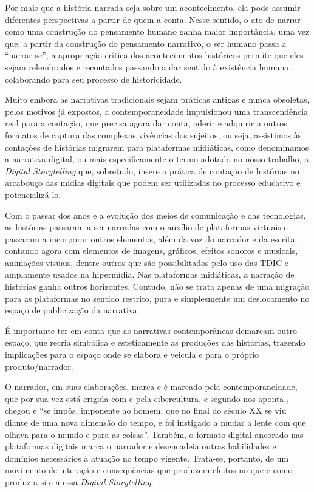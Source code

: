 \documentclass[portuguese]{textolivre}
\begin{document}
Por mais que a história narrada seja sobre um acontecimento, ela pode assumir diferentes perspectivas a partir de quem a conta. Nesse sentido, o ato de narrar como uma construção do pensamento humano ganha maior importância, uma vez que, a partir da construção do pensamento narrativo, o ser humano passa a “narrar-se”; a apropriação crítica dos acontecimentos históricos permite que eles sejam relembrados e recontados passando a dar sentido à existência humana \cite{rodrigues2020narrativas,rodrigues2023para}, colaborando para seu processo de historicidade.

Muito embora as narrativas tradicionais sejam práticas antigas e nunca obsoletas, pelos motivos já expostos, a contemporaneidade impulsionou uma transcendência real para a contação, que precisa agora dar conta, aderir e adquirir a outros formatos de captura das complexas vivências dos sujeitos, ou seja, assistimos às contações de histórias migrarem para plataformas midiáticas, como denominamos a narrativa digital, ou mais especificamente o termo adotado no nosso trabalho, a \textit{Digital Storytelling} que, sobretudo, insere a prática de contação de histórias no arcabouço das mídias digitais que podem ser utilizadas no processo educativo e potencializá-lo.

Com o passar dos anos e a evolução dos meios de comunicação e das tecnologias, as histórias passaram a ser narradas com o auxílio de plataformas virtuais e passaram a incorporar outros elementos, além da voz do narrador e da escrita; contando agora com elementos de imagens, gráficos, efeitos sonoros e musicais, animações visuais, dentre outros que são possibilitados pelo uso das TDIC e amplamente usados na hipermídia. Nas plataformas midiáticas, a narração de histórias ganha outros horizontes. Contudo, não se trata apenas de uma migração para as plataformas no sentido restrito, pura e simplesmente um deslocamento no espaço de publicização da narrativa.

É importante ter em conta que as narrativas contemporâneas demarcam outro espaço, que recria simbólica e esteticamente as produções das histórias, trazendo implicações para o espaço onde se elabora e veicula e para o próprio produto/narrador.

O narrador, em suas elaborações, marca e é marcado pela contemporaneidade, que por sua vez está erigida com e pela cibercultura, e segundo nos aponta \textcite[p.~93]{busatto2005narrando}, chegou e “se impôs, imponente ao homem, que no final do século XX se viu diante de uma nova dimensão do tempo, e foi instigado a mudar a lente com que olhava para o mundo e para as coisas”. Também, o formato digital ancorado nas plataformas digitais marca o narrador e desencadeia outras habilidades e domínios necessários à atuação no tempo vigente. Trata-se, portanto, de um movimento de interação e consequências que produzem efeitos no que e como produz a si e a essa \textit{Digital Storytelling}.
\end{document}
